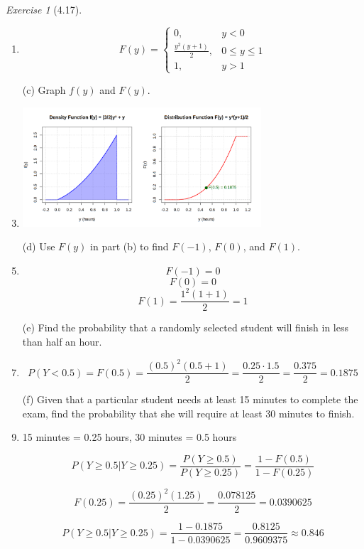 \documentclass[12pt]{amsart}
\makeatletter
\theoremstyle{remark}
\newtheorem*{exercise}{Exercise}%
\renewenvironment{proof}[1][\proofname]{\par\doublespacing
  \pushQED{\qed}%
  \normalfont \topsep6\p@\@plus6\p@\relax
  \list{}{%
    \settowidth{\leftmargin}{\itshape\proofname:\hskip\labelsep}%
    \setlength{\labelwidth}{0pt}%
    \setlength{\itemindent}{-\leftmargin}%
  }%
  \item[\hskip\labelsep\itshape#1\@addpunct{:}]\ignorespaces
}{%
  \popQED\endlist\@endpefalse
  \singlespacing
}
\theoremstyle{mycomment}
\makeatother
\begin{document}
\begin{exercise}[4.17]
\begin{enumerate}
\begin{proof}[Solution]
	$$F(y) = \begin{cases}
	0, & y < 0 \\
	\frac{y^2(y+1)}{2}, & 0 \leq y \leq 1 \\
	1, & y > 1
	\end{cases}$$
\end{proof}
    \item[(c)] Graph $f(y)$ and $F(y)$.
\begin{proof}[Solution]
 	\includegraphics[width=0.7\textwidth]{exercise_4_17c.png}
\end{proof}
    \item[(d)] Use $F(y)$ in part (b) to find $F(-1)$, $F(0)$, and $F(1)$.
\begin{proof}[Solution]
 	$$F(-1) = 0$$
	$$F(0) = 0$$
	$$F(1) = \frac{1^2(1+1)}{2} = 1$$
\end{proof}
    \item[(e)] Find the probability that a randomly selected student will finish in less than half an hour.
\begin{proof}[Solution]
 	$$P(Y < 0.5) = F(0.5) = \frac{(0.5)^2(0.5+1)}{2} = \frac{0.25 \cdot 1.5}{2} = \frac{0.375}{2} = 0.1875$$
\end{proof}
    \item[(f)] Given that a particular student needs at least 15 minutes to complete the exam, find the probability that she will require at least 30 minutes to finish.
\begin{proof}[Solution]
 15 minutes = 0.25 hours, 30 minutes = 0.5 hours
	
	$$P(Y \geq 0.5 | Y \geq 0.25) = \frac{P(Y \geq 0.5)}{P(Y \geq 0.25)} = \frac{1 - F(0.5)}{1 - F(0.25)}$$
	
	$$F(0.25) = \frac{(0.25)^2(1.25)}{2} = \frac{0.078125}{2} = 0.0390625$$
	
	$$P(Y \geq 0.5 | Y \geq 0.25) = \frac{1 - 0.1875}{1 - 0.0390625} = \frac{0.8125}{0.9609375} \approx 0.846$$
\end{proof}
\end{enumerate} 
\end{exercise}
\end{document}
